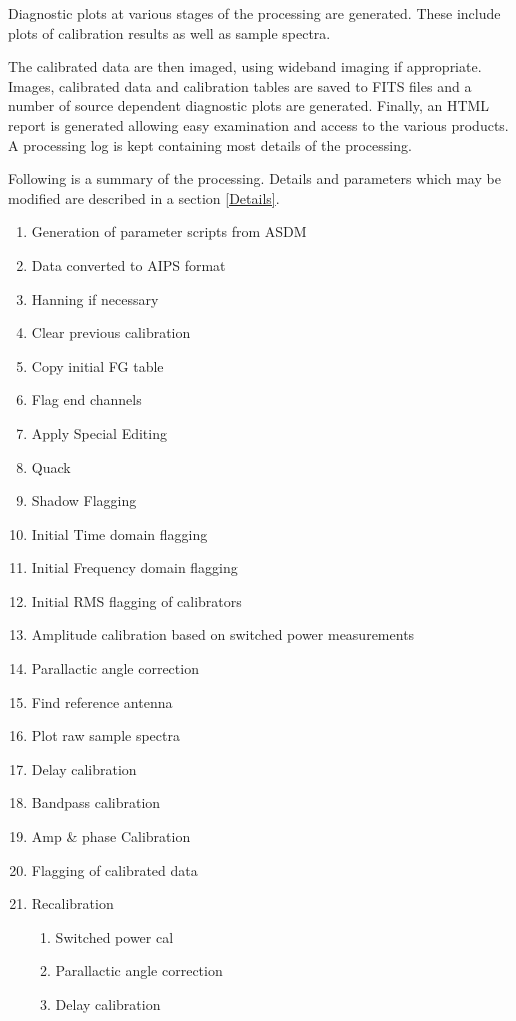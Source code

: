 \documentclass[11pt]{article}
\begin{document}
Diagnostic plots at various stages of the processing are generated.
These  include plots of calibration results as well as sample spectra.

The calibrated data are then imaged, using wideband imaging if
appropriate. 
Images, calibrated data and calibration tables are saved to FITS files
and a number of source dependent diagnostic plots are generated.
Finally, an HTML report is generated allowing easy examination and
access to the various products.
A processing log is kept containing most details of the processing.

Following is a summary of the processing.
Details and parameters which may be modified are described in a
section \ref{Details}.

\begin{enumerate}
\item Generation of parameter scripts from ASDM
\item Data converted to AIPS format
\item Hanning if necessary
\item Clear previous calibration
\item Copy initial FG table 
\item Flag end channels 
\item Apply Special Editing
\item Quack
\item Shadow Flagging 
\item Initial Time domain flagging
\item Initial Frequency domain flagging
\item Initial RMS flagging of calibrators
\item Amplitude calibration based on switched power measurements
\item Parallactic angle correction
\item Find reference antenna 
\item Plot raw sample spectra 
\item Delay calibration
\item Bandpass calibration
\item Amp \& phase Calibration 
\item Flagging of calibrated data
\item Recalibration 
\begin{enumerate}
\item Switched power cal
\item Parallactic angle correction
\item Delay calibration

\end{enumerate}
\end{enumerate}
\end{document}
